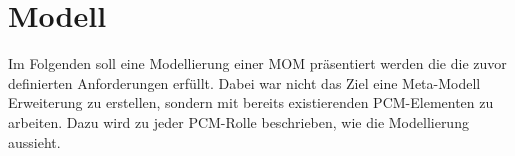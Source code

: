 


\section{Modell}
Im Folgenden soll eine Modellierung einer MOM präsentiert werden die die zuvor definierten Anforderungen erfüllt. Dabei war nicht das Ziel eine Meta-Modell Erweiterung zu erstellen, sondern mit bereits existierenden PCM-Elementen zu arbeiten. Dazu wird zu jeder PCM-Rolle beschrieben, wie die Modellierung aussieht.


